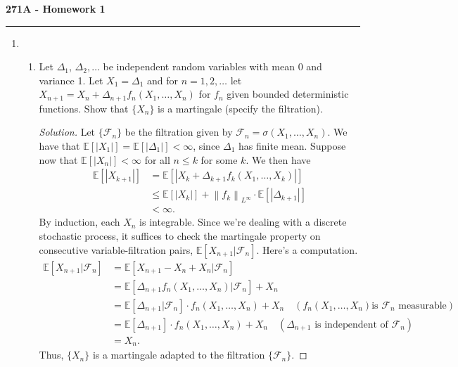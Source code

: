 \documentclass[11pt,letterpaper]{report}
\newcommand{\mcal}[1]{\mathcal{#1}}
\newcommand{\Lp}[2]{\left\|{#1}\right\|_{L^{#2}}}
\newcommand{\E}{\mathbb{E}}
\newenvironment{solution}
{\begin{proof}[Solution]}
{\end{proof}}
\begin{document}
\begin{center}
{\bf \Large 271A - Homework 1}
\vspace{0.2cm}
\hrule
\end{center}

\begin{enumerate}
	\item \begin{enumerate}
		\item Let $\Delta_1$, $\Delta_2, \ldots$ be independent random variables with mean 0 and variance 1. Let $X_1 = \Delta_1$ and for $n = 1, 2, \ldots$ let $X_{n+1} = X_n + \Delta_{n+1}f_n(X_1, \ldots, X_n)$ for $f_n$ given bounded deterministic functions. Show that $\{X_n\}$ is a martingale (specify the filtration).
		\begin{solution}
			Let $\{\mcal{F}_n\}$ be the filtration given by $\mcal{F}_n = \sigma(X_1, \ldots, X_n)$. We have that $\E[|X_1|] = \E[|\Delta_1|]<\infty$, since $\Delta_1$ has finite mean. Suppose now that $\E[|X_n|]<\infty$ for all $n \leq k$ for some $k$. We then have
			\begin{align*}
				\E[|X_{k+1}|] &= \E[|X_k + \Delta_{k+1}f_k(X_1, \ldots, X_k)|]\\
				&\leq \E[|X_k|] + \Lp{f_k}{\infty}\cdot\E[|\Delta_{k+1}|]\\
				&<\infty.
			\end{align*}
			By induction, each $X_n$ is integrable. Since we're dealing with a discrete stochastic process, it suffices to check the martingale property on consecutive variable-filtration pairs, $\E[X_{n+1}|\mcal{F}_n]$. Here's a computation.
			\begin{align*}
				\E[X_{n+1}| \mcal{F}_n] &= \E[X_{n+1} - X_n + X_n | \mcal{F}_n]\\
				&= \E[\Delta_{n+1}f_n(X_1, \ldots, X_n)|\mcal{F}_n] + X_n\\
				&= \E[\Delta_{n+1}|\mcal{F}_n]\cdot f_n(X_1, \ldots, X_n) + X_n \quad(f_n(X_1, \ldots, X_n)\text{is }\mcal{F}_n\text{ measurable})\\
				&= \E[\Delta_{n+1}]\cdot f_n(X_1, \ldots, X_n) +X_n\quad (\Delta_{n+1}\text{ is independent of }\mcal{F}_n)\\
				&= X_n.
			\end{align*}
			Thus, $\{X_n\}$ is a martingale adapted to the filtration $\{\mcal{F}_n\}$.
		\end{solution}


\end{enumerate}
\end{enumerate}
\end{document}
